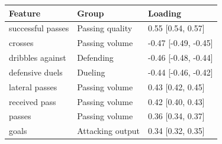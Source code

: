 
\begin{tabular}{lll}
\toprule
Feature & Group & Loading\\
\midrule
successful passes & Passing quality & 0.55 [0.54, 0.57]\\
crosses & Passing volume & -0.47 [-0.49, -0.45]\\
dribbles against & Defending & -0.46 [-0.48, -0.44]\\
defensive duels & Dueling & -0.44 [-0.46, -0.42]\\
lateral passes & Passing volume & 0.43 [0.42, 0.45]\\
received pass & Passing volume & 0.42 [0.40, 0.43]\\
passes & Passing volume & 0.36 [0.34, 0.37]\\
goals & Attacking output & 0.34 [0.32, 0.35]\\
\bottomrule
\end{tabular}
